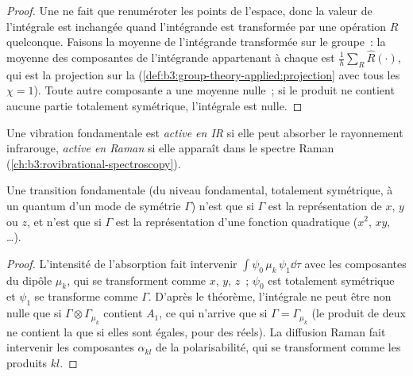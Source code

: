 \begin{proof}
Une  ne fait que renuméroter les points de l'espace,
donc la valeur de l'intégrale est inchangée quand l'intégrande est
transformée par une opération $R$ quelconque. Faisons la moyenne de
l'intégrande transformée sur le groupe~: la moyenne des composantes de
l'intégrande appartenant à chaque  est
$\frac1h\sum_R\hat R(\cdot)$, qui est la projection sur la 
(\cref{def:b3:group-theory-applied:projection} avec tous les
$\chi = 1$). Toute autre composante a une moyenne nulle~; si le produit
ne contient aucune partie totalement symétrique, l'intégrale est nulle.
\end{proof}

\begin{definition}\label{def:b3:group-theory-applied:activity}
Une vibration fondamentale est \emph{active en IR} si
elle peut absorber le rayonnement infrarouge, \emph{active en Raman} si elle
apparaît dans le spectre Raman (\cref{ch:b3:rovibrational-spectroscopy}).
\end{definition}

\begin{corollary}\label{cor:b3:group-theory-applied:ir-raman}
Une transition fondamentale (du niveau fondamental, totalement
symétrique, à un quantum d'un mode de symétrie $\Gamma$) n'est  que si $\Gamma$ est la
représentation de $x$, $y$ ou $z$, et n'est  que si
$\Gamma$ est la représentation d'une fonction quadratique ($x^2$, $xy$,
\dots).
\end{corollary}

\begin{proof}
L'intensité de l'absorption fait intervenir $\int\psi_0\,\mu_k\,\psi_1\dd\tau$
avec les composantes du dipôle
$\mu_k$, qui se transforment comme $x$, $y$, $z$~; $\psi_0$ est
totalement symétrique
et $\psi_1$ se transforme comme $\Gamma$. D'après le théorème, l'intégrale
ne peut être non nulle
que si $\Gamma\otimes\Gamma_{\mu_k}$ contient $A_1$, ce qui n'arrive que si $\Gamma =
\Gamma_{\mu_k}$ (le produit de deux  ne
contient la  que si elles sont
égales, pour des  réels). La diffusion Raman fait intervenir
les composantes $\alpha_{kl}$ de la polarisabilité, qui se transforment
comme les produits $kl$.
\end{proof}

